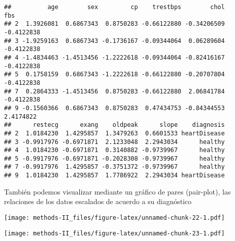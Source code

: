 \documentclass[
]{article}
\newenvironment{Shaded}{\begin{snugshade}}{\end{snugshade}}
\newcommand{\AttributeTok}[1]{\textcolor[rgb]{0.77,0.63,0.00}{#1}}
\newcommand{\CommentTok}[1]{\textcolor[rgb]{0.56,0.35,0.01}{\textit{#1}}}
\newcommand{\DecValTok}[1]{\textcolor[rgb]{0.00,0.00,0.81}{#1}}
\newcommand{\FloatTok}[1]{\textcolor[rgb]{0.00,0.00,0.81}{#1}}
\newcommand{\FunctionTok}[1]{\textcolor[rgb]{0.00,0.00,0.00}{#1}}
\newcommand{\NormalTok}[1]{#1}
\newcommand{\SpecialCharTok}[1]{\textcolor[rgb]{0.00,0.00,0.00}{#1}}
\begin{document}
\begin{verbatim}
##          age        sex         cp    trestbps        chol        fbs
## 2  1.3926081  0.6867343  0.8750283 -0.66122880 -0.34206509 -0.4122838
## 3 -1.9259163  0.6867343 -0.1736167 -0.09344064  0.06289604 -0.4122838
## 4 -1.4834463 -1.4513456 -1.2222618 -0.09344064 -0.82416167 -0.4122838
## 5  0.1758159  0.6867343 -1.2222618 -0.66122880 -0.20707804 -0.4122838
## 7  0.2864333 -1.4513456  0.8750283 -0.66122880  2.06841784 -0.4122838
## 9 -0.1560366  0.6867343  0.8750283  0.47434753 -0.84344553  2.4174822
##      restecg      exang    oldpeak      slope    diagnosis
## 2  1.0184230  1.4295857  1.3479263  0.6601533 heartDisease
## 3 -0.9917976 -0.6971871  2.1233048  2.2943034      healthy
## 4  1.0184230 -0.6971871  0.3140882 -0.9739967      healthy
## 5 -0.9917976 -0.6971871 -0.2028308 -0.9739967      healthy
## 7 -0.9917976  1.4295857 -0.3751372 -0.9739967      healthy
## 9  1.0184230  1.4295857  1.7786922  2.2943034 heartDisease
\end{verbatim}

También podemos visualizar mediante un gráfico de pares (pair-plot), las
relaciones de los datos escalados de acuerdo a su diagnóstico

\begin{Shaded}
\end{Shaded}

\texttt{[image: methods-II\_files/figure-latex/unnamed-chunk-22-1.pdf]}

\begin{Shaded}
\end{Shaded}

\texttt{[image: methods-II\_files/figure-latex/unnamed-chunk-23-1.pdf]}
\end{document}
